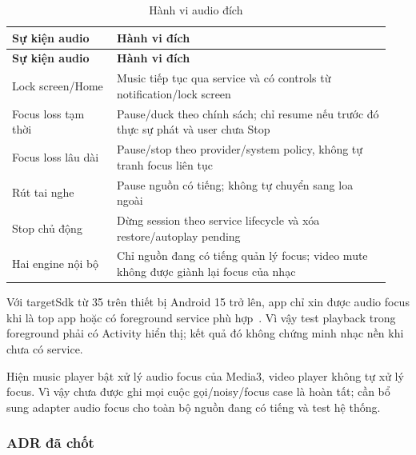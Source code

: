 \begingroup
\small
\renewcommand{\arraystretch}{1.2}
\setlength{\tabcolsep}{3pt}
\begin{longtable}{>{\RaggedRight\arraybackslash}p{0.26\linewidth}>{\RaggedRight\arraybackslash}p{0.68\linewidth}}
\caption{Hành vi audio đích}
\label{tab:audio-rules}\\
\toprule
\textbf{Sự kiện audio} & \textbf{Hành vi đích} \\
\midrule
\endfirsthead
\toprule
\textbf{Sự kiện audio} & \textbf{Hành vi đích} \\
\midrule
\endhead
\bottomrule
\endfoot
Lock screen/Home & Music tiếp tục qua service và có controls từ notification/lock screen \\
Focus loss tạm thời & Pause/duck theo chính sách; chỉ resume nếu trước đó thực sự phát và user chưa Stop \\
Focus loss lâu dài & Pause/stop theo provider/system policy, không tự tranh focus liên tục \\
Rút tai nghe & Pause nguồn có tiếng; không tự chuyển sang loa ngoài \\
Stop chủ động & Dừng session theo service lifecycle và xóa restore/autoplay pending \\
Hai engine nội bộ & Chỉ nguồn đang có tiếng quản lý focus; video mute không được giành lại focus của nhạc \\
\end{longtable}
\endgroup

Với targetSdk từ 35 trên thiết bị Android 15 trở lên, app chỉ xin được audio focus khi là top app hoặc có foreground service phù hợp~\cite{android-audiofocus}. Vì vậy test playback trong foreground phải có Activity hiển thị; kết quả đó không chứng minh nhạc nền khi chưa có service.

Hiện music player bật xử lý audio focus của Media3, video player không tự xử lý focus. Vì vậy chưa được ghi mọi cuộc gọi/noisy/focus case là hoàn tất; cần bổ sung adapter audio focus cho toàn bộ nguồn đang có tiếng và test hệ thống.

\subsubsection{ADR đã chốt}
\label{sec:adr}

